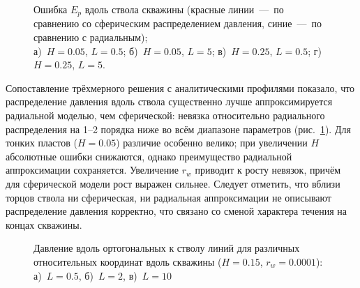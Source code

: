 \documentclass{article}
\begin{document}
\begin{figure}[H]
	\caption{Ошибка $E_p$ вдоль ствола скважины
		(красные линии~---~по сравнению со сферическим распределением давления,
		синие~---~по сравнению с радиальным); \\
		а)~$H=0.05$, $L=0.5$; б)~$H=0.05$, $L=5$;
		в)~$H=0.25$, $L=0.5$; г)~$H=0.25$, $L=5$.
	}
	\label{fig:kham_rad_hypo_fault_p_over_l_mgrp}
\end{figure}

Сопоставление трёхмерного решения с аналитическими профилями показало,
что распределение давления вдоль ствола существенно лучше аппроксимируется
радиальной моделью, чем сферической: невязка относительно радиального распределения
на 1--2 порядка ниже во всём диапазоне параметров (рис.~\ref{fig:kham_rad_hypo_fault_p_over_l_mgrp}).
Для тонких пластов ($H=0.05$) различие особенно велико; при увеличении $H$
абсолютные ошибки снижаются, однако преимущество радиальной аппроксимации сохраняется.
Увеличение $r_w$ приводит к росту невязок, причём для сферической модели рост выражен сильнее.
Следует отметить, что вблизи торцов ствола ни сферическая, ни радиальная аппроксимации
не описывают распределение давления корректно, что связано со сменой характера течения
на концах скважины.

\begin{figure}[H]
	\centering
	\begin{subfigure}{0.3\textwidth}
		
		\caption{}
		\label{fig:kham_rad_hypo_fault_p_over_l_L05_rw0001_H015_mgrp}
	\end{subfigure}
	\hfill
	\begin{subfigure}{0.3\textwidth}
		
		\caption{}
		\label{fig:kham_rad_hypo_fault_p_over_l_L2_rw0001_H015_mgrp}
	\end{subfigure}
	\hfill
	\begin{subfigure}{0.3\textwidth}
		
		\caption{}
		\label{fig:kham_rad_hypo_fault_p_over_l_L10_rw0001_H015_mgrp}
	\end{subfigure}

	\caption{
		Давление вдоль ортогональных к стволу линий для различных относительных
		координат вдоль скважины ($H=0.15$, $r_w = 0.0001$):
		а)~$L=0.5$, б)~$L=2$, в)~$L=10$
	}
	\label{fig:kham_rad_hypo_fault_p_over_l_rw0001_H015_mgrp}
\end{figure}
\end{document}
